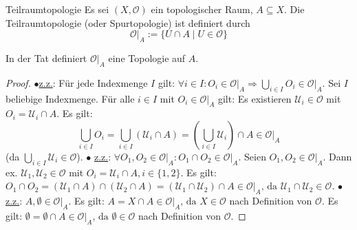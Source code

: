 \documentclass[a4paper,11pt,notitlepage]{report}
\theoremstyle{definition}
\newcommand{\OO}{{\ensuremath{\mathcal{O}}}}
\begin{document}
\begin{section}{Teilraumtopologie}
	Es sei $(X, \OO)$ ein topologischer Raum, $A \subseteq X$.
	\newline
	Die Teilraumtopologie (oder Spurtopologie) ist definiert durch
	$$\OO \big |_{A} := \{U \cap A \mid U \in \OO\} $$
	
	\begin{theorem}
		In der Tat definiert $\OO \big |_{A}$ eine Topologie auf $A$.
	\end{theorem}
	
	\begin{proof}
			$\bullet$\underline{z.z.}: Für jede Indexmenge $I$ gilt:
				$\forall i \in I \colon O_i \in \OO \big |_{A} \Rightarrow \bigcup\limits_{i \in I}{O_i} \in \OO \big |_{A}.$
			\newline
			Sei $I$ beliebige Indexmenge. Für alle $i \in I$ mit $O_i \in \OO \big |_{A}$ gilt:
			Es existieren $\mathcal{U}_i \in \OO$ mit $O_i= \mathcal{U}_i \cap A$.
			Es gilt:
			$$\bigcup\limits_{i \in I}{O_i} = \bigcup\limits_{i \in I}{(\mathcal{U}_i \cap A) } = (\bigcup\limits_{i \in I}{\mathcal{U}_i})\cap A \in \OO \big |_{A}$$ (da $\bigcup\limits_{i \in I}{\mathcal{U}_i} \in \OO$).
			\newline
			$\bullet$ \underline{z.z.}: $\forall O_1, O_2 \in \OO \big |_{A} \colon O_1 \cap O_2 \in \OO \big |_{A}.$
			\newline
			Seien $O_1, O_2 \in \OO \big |_{A}$. Dann ex. $\mathcal{U}_1, \mathcal{U}_2 \in \OO$ mit $O_i = \mathcal{U}_i \cap A, i \in \{1,2\}.$ Es gilt:
			$O_1 \cap O_2 = (\mathcal{U}_1 \cap A) \cap (\mathcal{U}_2 \cap A) = (\mathcal{U}_1 \cap \mathcal{U}_2) \cap A \in \OO \big |_{A} \text{, da } \mathcal{U}_1 \cap \mathcal{U}_2 \in \OO.$
			\newline
			$\bullet$ \underline{z.z.}: $A, \emptyset \in \OO \big |_{A}.$
			\newline
			Es gilt: $A = X \cap A \in \OO \big |_{A}\text{, da } X \in \OO$ nach Definition von $\OO$. 
			\newline
			Es gilt: $\emptyset = \emptyset \cap A \in \OO \big |_{A} \text{, da } \emptyset \in \OO$ nach Definition von $\OO$.
	\end{proof}
\end{section}
\end{document}

